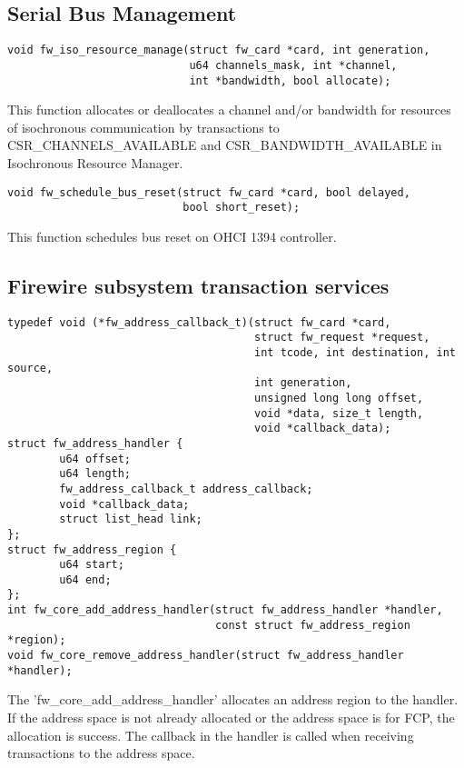 \documentclass[onecolumn]{article}
\begin{document}
\subsection{Serial Bus Management}

\begin{verbatim}
void fw_iso_resource_manage(struct fw_card *card, int generation,
                            u64 channels_mask, int *channel,
                            int *bandwidth, bool allocate);
\end{verbatim}

This function allocates or deallocates a channel and/or bandwidth for resources of isochronous communication by transactions to CSR\_CHANNELS\_AVAILABLE and CSR\_BANDWIDTH\_AVAILABLE in Isochronous Resource Manager.

\begin{verbatim}
void fw_schedule_bus_reset(struct fw_card *card, bool delayed,
                           bool short_reset);
\end{verbatim}

This function schedules bus reset on OHCI 1394 controller.

\subsection{Firewire subsystem transaction services}

\begin{verbatim}
typedef void (*fw_address_callback_t)(struct fw_card *card,
                                      struct fw_request *request,
                                      int tcode, int destination, int source,
                                      int generation,
                                      unsigned long long offset,
                                      void *data, size_t length,
                                      void *callback_data);
struct fw_address_handler {
        u64 offset;
        u64 length;
        fw_address_callback_t address_callback;
        void *callback_data;
        struct list_head link;
};
struct fw_address_region {
        u64 start;
        u64 end;
};
int fw_core_add_address_handler(struct fw_address_handler *handler,
                                const struct fw_address_region *region);
void fw_core_remove_address_handler(struct fw_address_handler *handler);
\end{verbatim}

The 'fw\_core\_add\_address\_handler' allocates an address region to the handler. If the address space is not already allocated or the address space is for FCP, the allocation is success. The callback in the handler is called when receiving transactions to the address space.
\end{document}
